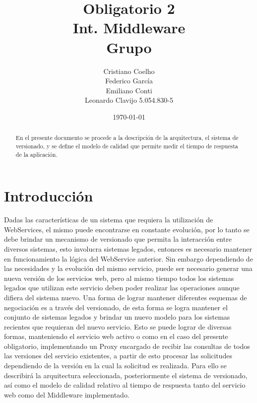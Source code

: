 \documentclass[12pt]{article}
\title{Obligatorio 2 \\ Int. Middleware \\ Grupo }
\author{
  Cristiano Coelho \\
  Federico García \\
  Emiliano Conti \\
  Leonardo Clavijo 5.054.830-5
}
\date{\today}
\begin{document}
\maketitle

\begin{abstract}
En el presente documento se procede a la descripción de la arquitectura, el sistema de versionado,  y se define el modelo de calidad que permite medir el tiempo de respuesta de la aplicación.
\end{abstract}

\newpage
\tableofcontents
\newpage

\section{Introducción}
Dadas las características de un sistema que requiera la utilización de WebServices, el mismo puede encontrarse en constante evolución, por lo tanto se debe brindar un mecanismo de versionado que permita la interacción entre diversos sistemas, esto involucra sistemas legados, entonces es necesario mantener en funcionamiento la lógica del WebService anterior. Sin embargo dependiendo de las necesidades y la evolución del mismo servicio, puede ser necesario generar una nueva versión de los servicios web, pero al mismo tiempo todos los sistemas legados que utilizan este servicio deben poder realizar las operaciones aunque difiera del sistema nuevo.
Una forma de lograr mantener diferentes esquemas de negociación es a través del versionado, de esta forma se logra mantener el conjunto de sistemas legados y brindar un nuevo modelo para los sistemas recientes que requieran del nuevo servicio. Esto se puede lograr de diversas formas, manteniendo el servicio web activo o como en el caso del presente obligatorio, implementando un Proxy encargado de recibir las consultas de todos las versiones del servicio existentes, a partir de esto procesar las solicitudes dependiendo de la versión en la cual la solicitud es realizada. Para ello se describirá la arquitectura seleccionada, posteriormente el sistema de versionado, así como el modelo de calidad relativo al tiempo de respuesta tanto del servicio web como del Middleware implementado.
\end{document}
